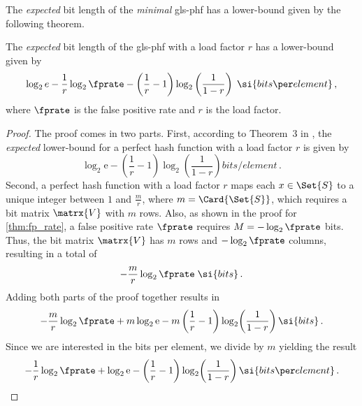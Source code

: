 The \emph{expected} bit length of the \emph{minimal} \gls{gls-phf} has a lower-bound given by the following theorem.
\begin{theorem}
\label{thm:mPHF_size}
The \emph{expected} bit length of the \gls{gls-phf} with a load factor $r$ has a lower-bound given by
\begin{equation}
\label{eq:mPHF_size}
    \log_2 e - \frac{1}{r} \log_2 \fprate - \left(\frac{1}{r} - 1\right) \log_2\left(\frac{1}{1-r}\right)\; \si{bits \per element}\,,
\end{equation}
where $\fprate$ is the false positive rate and $r$ is the load factor.
\end{theorem}
\begin{proof}
The proof comes in two parts. First, according to Theorem~3 in \cite{oph}, the \emph{expected} lower-bound for a perfect hash function with a load factor $r$ is given by
\begin{equation}
    \log_2 \mathrm{e} - \left(\frac{1}{r} - 1\right) \log_2\!\left(\frac{1}{1-r}\right) \si{bits \per element}\,.
\end{equation}
Second, a perfect hash function with a load factor $r$ maps each $x \in \Set{S}$ to a unique integer between $1$ and $\frac{m}{r}$, where $m=\Card{\Set{S}}$, which requires a bit matrix $\matrx{V}$ with $m$ rows. Also, as shown in the proof for \cref{thm:fp_rate}, a false positive rate $\fprate$ requires $M = -\log_2 \fprate$ bits. Thus, the bit matrix $\matrx{V}$ has $m$ rows and $-\log_2 \fprate$ columns, resulting in a total of
\begin{equation}
    -\frac{m}{r} \log_2 \fprate \; \si{bits}\,.
\end{equation}
Adding both parts of the proof together results in
\begin{equation}
    -\frac{m}{r} \log_2 \fprate + m \log_2 \mathrm{e} - m \left(\frac{1}{r} - 1\right) \log_2\!\left(\frac{1}{1-r}\right) \si{bits}\,.
\end{equation}
Since we are interested in the bits per element, we divide by $m$ yielding the result
\begin{equation}
    -\frac{1}{r} \log_2 \fprate + \log_2 \mathrm{e} -  \left(\frac{1}{r} - 1\right) \log_2\!\left(\frac{1}{1-r}\right) \si{bits \per element}\,.
\end{equation}
\end{proof}

